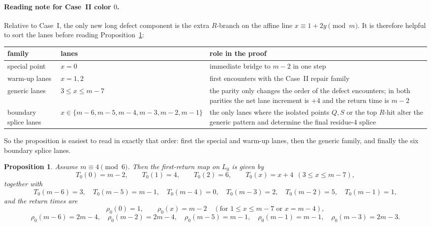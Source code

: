 \documentclass[11pt]{article}
\newtheorem{proposition}{Proposition}
\begin{document}
\paragraph{Reading note for Case~II color $0$.}
Relative to Case~I, the only new long defect component is the extra $R$-branch on the affine line $x\equiv 1+2y\pmod m$.
It is therefore helpful to sort the lanes before reading Proposition~\ref{prop:R0-caseII-data}:
\begin{center}
{\footnotesize
\renewcommand{\arraystretch}{1.15}
\begin{tabularx}{\textwidth}{@{}ll>{\raggedright\arraybackslash}X@{}}
\toprule
family & lanes & role in the proof \\
\midrule
special point & $x=0$ & immediate bridge to $m-2$ in one step \\
warm-up lanes & $x=1,2$ & first encounters with the Case~II repair family \\
generic lanes & $3\le x\le m-7$ & the parity only changes the order of the defect encounters; in both parities the net lane increment is $+4$ and the return time is $m-2$ \\
boundary splice lanes & $x\in\{m-6,m-5,m-4,m-3,m-2,m-1\}$ & the only lanes where the isolated points $Q,S$ or the top $R$-hit alter the generic pattern and determine the final residue-$4$ splice \\
\bottomrule
\end{tabularx}
}
\end{center}
So the proposition is easiest to read in exactly that order: first the special and warm-up lanes, then the generic family, and finally the six boundary splice lanes.

\begin{proposition}\label{prop:R0-caseII-data}
Assume $m\equiv 4\pmod 6$.
Then the first-return map on $L_0$ is given by
\[
T_0(0)=m-2,\qquad T_0(1)=4,\qquad T_0(2)=6,\qquad T_0(x)=x+4\ \ (3\le x\le m-7),
\]
together with
\[
T_0(m-6)=3,\quad T_0(m-5)=m-1,\quad T_0(m-4)=0,\quad T_0(m-3)=2,\quad T_0(m-2)=5,\quad T_0(m-1)=1,
\]
and the return times are
\[
\rho_0(0)=1,\qquad \rho_0(x)=m-2 \quad (\text{for } 1\le x\le m-7 \text{ or } x=m-4),
\]
\[
\rho_0(m-6)=2m-4,\quad \rho_0(m-2)=2m-4,\quad \rho_0(m-5)=m-1,\quad \rho_0(m-1)=m-1,\quad
\rho_0(m-3)=2m-3.
\]
\end{proposition}
\end{document}
